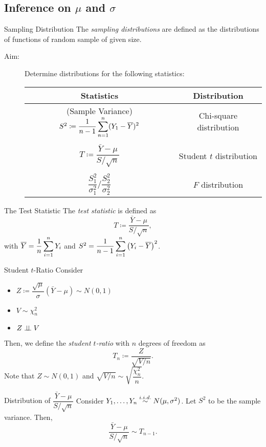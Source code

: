 \subsection{Inference on $\mu$ and $\sigma$}
\begin{df}{Sampling Distribution}
	The \textit{sampling distributions} are defined as the distributions of functions of random sample of given size. 	
\end{df}
\begin{description}
	\item[Aim:] Determine distributions for the following statistics: 
	\begin{center}
	\begin{tabular}{c|c}
		Statistics&Distribution\\\hline
		(Sample Variance) $S^2\coloneqq\dfrac{1}{n-1}\displaystyle\sum_{n=1}^n(Y_1-\overline Y)^2$&Chi-square distribution\\\\
		$T\coloneqq \dfrac{\bar Y-\mu}{S/\sqrt{n}}$&Student $t$ distribution\\\\
		$\dfrac{S_1^2}{\sigma_1^2}\Big/\dfrac{S_2^2}{\sigma_2^2}$&$F$ distribution
	\end{tabular}
	\end{center}
\end{description}
\begin{df}{The Test Statistic}
	The \textit{test statistic} is defined as \[T\coloneqq\dfrac{\bar Y-\mu}{S/\sqrt{n}},\]	 with $\overline Y=\dfrac{1}{n}\displaystyle\sum_{i=1}^n Y_i$ and $S^2=\displaystyle\dfrac{1}{n-1}\sum_{i=1}^n\qty(Y_i-\overline Y)^2$.
\end{df}
\begin{df}{Student $t$-Ratio}
	Consider \begin{itemize}
		\item $Z\coloneqq\dfrac{\sqrt{\mu}}{\sigma}(\bar Y-\mu)\sim N(0,1)$
		\item $V\sim\chi_n^2$
		\item $Z\perp\!\!\!\perp V$
	\end{itemize}	
	Then, we define the \textit{student $t$-ratio} with $n$ degrees of freedom as \[T_n\coloneqq\dfrac{Z}{\sqrt{V/n}}.\] Note that $Z\sim N(0,1)$ and $\sqrt{V/n}\sim\sqrt{\dfrac{\chi_n^2}{n}}$.
\end{df}
\begin{thm}{Distribution of $\dfrac{\bar Y-\mu}{S/\sqrt{n}}$}
	Consider $Y_1,\dots,Y_n\stackrel{i.i.d.}{\sim}N(\mu,\sigma^2)$. Let $S^2$ to be the sample variance. Then, \[\dfrac{\bar Y-\mu}{S/\sqrt{n}}\sim T_{n-1}.\]
\end{thm}
